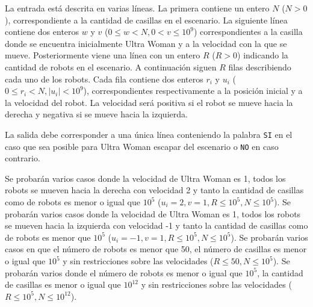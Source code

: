 \documentclass{oci}
\begin{document}
\begin{problemDescription}
\end{problemDescription}

\begin{inputDescription}
  La entrada está descrita en varias líneas.
  La primera contiene un entero $N$ ($N>0$), correspondiente a la cantidad de
  casillas en el escenario.
  La siguiente línea contiene dos enteros $w$ y $v$ ($0\leq w< N, 0<v\leq 10^9$)
  correspondientes a la casilla donde se encuentra inicialmente Ultra Woman y a la
  velocidad con la que se mueve.
  Posteriormente viene una línea con un entero $R$ ($R>0$) indicando la cantidad de
  robots en el escenario.
  A continuación siguen $R$ filas describiendo cada uno de los robots.
  Cada fila contiene dos enteros $r_i$ y $u_i$ ($0\leq r_i < N, |u_i|< 10^9$),
  correspondientes respectivamente a la posición inicial y a la velocidad del
  robot.
  La velocidad será positiva si el robot se mueve hacia la derecha y negativa si
  se mueve hacia la izquierda.
\end{inputDescription}

\begin{outputDescription}
La salida debe corresponder a una única línea conteniendo la palabra \texttt{SI}
en el caso que sea posible para Ultra Woman escapar del escenario o \texttt{NO}
en caso contrario.
\end{outputDescription}

\begin{scoreDescription}
   Se probarán varios casos donde la velocidad de Ultra Woman es 1,
  todos los robots se mueven hacia la derecha con velocidad 2 y tanto la
  cantidad de casillas como de robots es menor o igual que $10^5$ ($u_i=2, v=1,
  R\leq 10^5, N\leq 10^5$).
   Se probarán varios casos donde la velocidad de Ultra Woman es 1,
  todos los robots se mueven hacia la izquierda con velocidad -1 y tanto la cantidad
  de casillas como de robots es menor que $10^5$ ($u_i=-1, v=1, R\leq 10^5,
  N\leq 10^5$).
   Se probarán varios casos en que el número de robots es menor que
  50, el número de casillas es menor o igual que $10^5$ y sin restricciones sobre las
  velocidades ($R\leq 50, N\leq 10^5$).
   Se probarán varios donde el número de robots es menor o igual que
  $10^5$, la cantidad de casillas es menor o igual que $10^{12}$ y sin
  restricciones sobre las velocidades ($R\leq 10^5, N \leq10^{12}$).
\end{scoreDescription}

\begin{sampleDescription}
\end{sampleDescription}
\end{document}
